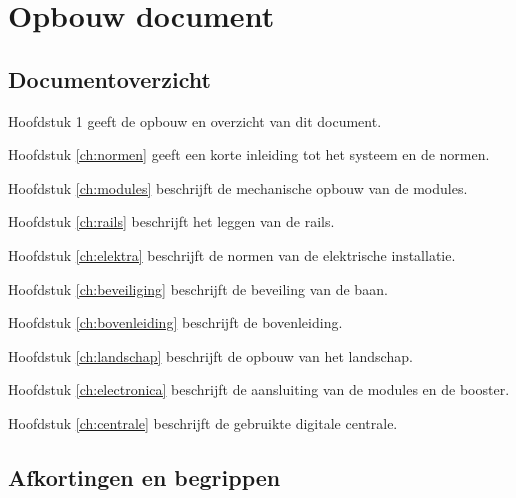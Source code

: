 \documentclass[12pt,a4paper]{report}
\begin{document}
\listoftables

\chapter{Opbouw document}

\section{Documentoverzicht}

Hoofdstuk 1 geeft de opbouw en overzicht van dit document.

Hoofdstuk \ref{ch:normen} geeft een korte inleiding tot het systeem en de normen.

Hoofdstuk \ref{ch:modules} beschrijft de mechanische opbouw van de modules.

Hoofdstuk \ref{ch:rails} beschrijft het leggen van de rails.

Hoofdstuk \ref{ch:elektra} beschrijft de normen van de elektrische installatie.

Hoofdstuk \ref{ch:beveiliging} beschrijft de beveiling van de baan.

Hoofdstuk \ref{ch:bovenleiding} beschrijft de bovenleiding.

Hoofdstuk \ref{ch:landschap} beschrijft de opbouw van het landschap.

Hoofdstuk \ref{ch:electronica} beschrijft de aansluiting van de modules en de booster.

Hoofdstuk \ref{ch:centrale} beschrijft de gebruikte digitale centrale.

\section{Afkortingen en begrippen}
\end{document}
